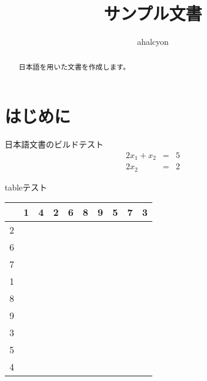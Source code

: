 \documentclass[uplatex,dvipdfmx]{jsarticle}
\title{サンプル文書}
\author{ahalcyon}
\begin{document}
\maketitle

\begin{abstract}
日本語を用いた文書を作成します。
\end{abstract}

\section{はじめに}


日本語文書のビルドテスト
\begin{eqnarray}
  2x_1 + x_2 & = & 5 \\
  2x_2 & = & 2
\end{eqnarray}
\begin{center}

\large{tableテスト}\\

\begin{tabular}{|l||l|l|l|l|l|l|l|l|l|}
\hline
{} &  1 &  4 &  2 &  6 &  8 &  9 &  5 &  7 &  3 \\\hline
\hline
2 &    &    &    &    &    &    &    &    &    \\\hline
6 &    &    &    &    &    &    &    &    &    \\\hline
7 &    &    &    &    &    &    &    &    &    \\\hline
1 &    &    &    &    &    &    &    &    &    \\\hline
8 &    &    &    &    &    &    &    &    &    \\\hline
9 &    &    &    &    &    &    &    &    &    \\\hline
3 &    &    &    &    &    &    &    &    &    \\\hline
5 &    &    &    &    &    &    &    &    &    \\\hline
4 &    &    &    &    &    &    &    &    &    \\\hline

\end{tabular}
\end{center}
\end{document}

